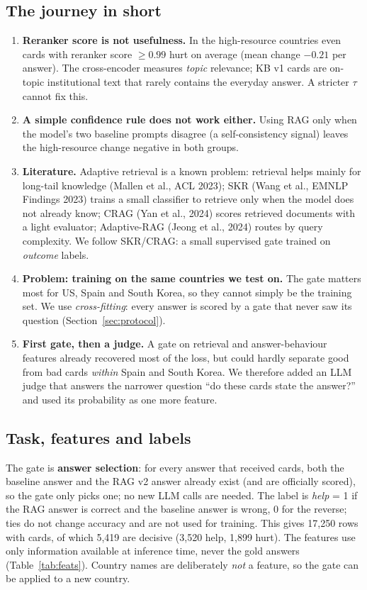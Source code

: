 \documentclass[11pt]{article}
\begin{document}
\subsection{The journey in short}
\begin{enumerate}
\item \textbf{Reranker score is not usefulness.} In the high-resource countries even cards with
reranker score $\geq 0.99$ hurt on average (mean change $-0.21$ per answer). The cross-encoder
measures \emph{topic} relevance; KB v1 cards are on-topic institutional text that rarely contains the
everyday answer. A stricter $\tau$ cannot fix this.
\item \textbf{A simple confidence rule does not work either.} Using RAG only when the model's two
baseline prompts disagree (a self-consistency signal) leaves the high-resource change negative in
both groups.
\item \textbf{Literature.} Adaptive retrieval is a known problem: retrieval helps mainly for long-tail
knowledge (Mallen et al., ACL 2023); SKR (Wang et al., EMNLP Findings 2023) trains a small classifier
to retrieve only when the model does not already know; CRAG (Yan et al., 2024) scores retrieved
documents with a light evaluator; Adaptive-RAG (Jeong et al., 2024) routes by query complexity. We
follow SKR/CRAG: a small supervised gate trained on \emph{outcome} labels.
\item \textbf{Problem: training on the same countries we test on.} The gate matters most for US,
Spain and South Korea, so they cannot simply be the training set. We use \emph{cross-fitting}: every
answer is scored by a gate that never saw its question (Section~\ref{sec:protocol}).
\item \textbf{First gate, then a judge.} A gate on retrieval and answer-behaviour features already
recovered most of the loss, but could hardly separate good from bad cards \emph{within} Spain and South
Korea. We therefore added an LLM judge that answers the narrower question ``do these cards state the
answer?'' and used its probability as one more feature.
\end{enumerate}

\subsection{Task, features and labels}
The gate is \textbf{answer selection}: for every answer that received cards, both the baseline answer
and the RAG v2 answer already exist (and are officially scored), so the gate only picks one; no new LLM
calls are needed. The label is \emph{help} = 1 if the RAG answer is correct and the baseline answer is
wrong, 0 for the reverse; ties do not change accuracy and are not used for training. This gives
17{,}250 rows with cards, of which 5{,}419 are decisive (3{,}520 help, 1{,}899 hurt). The features use
only information available at inference time, never the gold answers (Table~\ref{tab:feats}).
Country names are deliberately \emph{not} a feature, so the gate can be applied to a new country.
\end{document}
